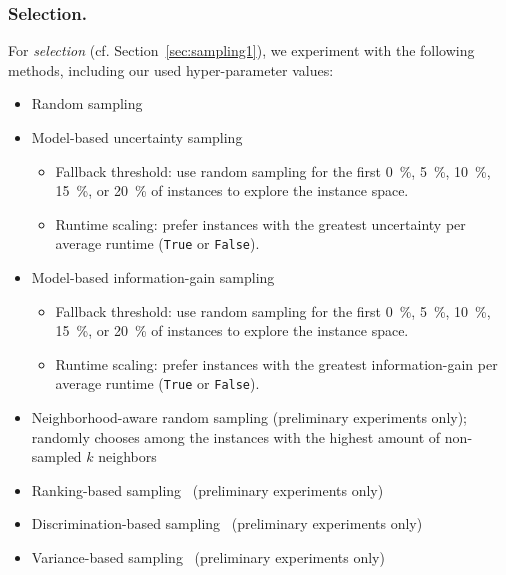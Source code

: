 \documentclass[runningheads]{llncs}
\begin{document}
\subsubsection{Selection.}
For \emph{selection} (cf. Section~\ref{sec:sampling1}), we experiment with the following methods, including our used hyper-parameter values:
\begin{itemize}
  \item Random sampling 
  \item Model-based uncertainty sampling
  \begin{itemize}
    \item Fallback threshold: use random sampling for the first \SI{0}{\%}, \SI{5}{\%}, \SI{10}{\%}, \SI{15}{\%}, or \SI{20}{\%} of instances to explore the instance space.
    \item Runtime scaling: prefer instances with the greatest uncertainty per average runtime (\texttt{True} or \texttt{False}).
  \end{itemize}

  \item Model-based information-gain sampling
  \begin{itemize}
    \item Fallback threshold: use random sampling for the first \SI{0}{\%}, \SI{5}{\%}, \SI{10}{\%}, \SI{15}{\%}, or \SI{20}{\%} of instances to explore the instance space.
    \item Runtime scaling: prefer instances with the greatest information-gain per average runtime (\texttt{True} or \texttt{False}).
  \end{itemize}

  \item Neighborhood-aware random sampling (preliminary experiments only); randomly chooses among the instances with the highest amount of non-sampled $k$ neighbors
  \item Ranking-based sampling~\cite{Bossek021a} (preliminary experiments only)
  \item Discrimination-based sampling~\cite{GentHJKMNN14} (preliminary experiments only)
  \item Variance-based sampling~\cite{MatriconAFSH21} (preliminary experiments only)
\end{itemize}
\end{document}

